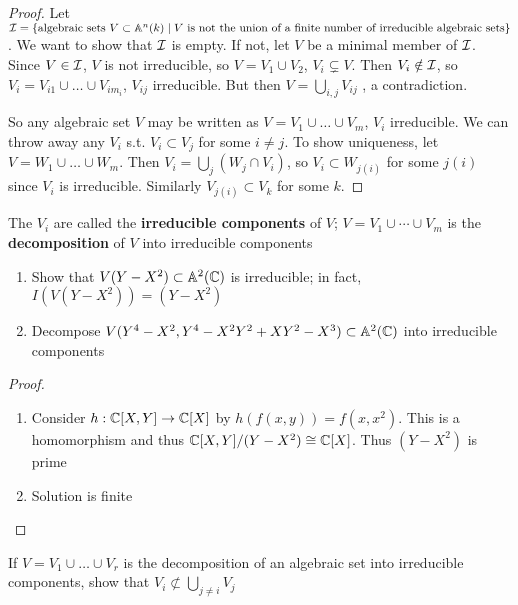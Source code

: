\documentclass[11pt]{article}
\begin{document}
\begin{proof}
Let
\(\mathcal{I}=\{\text{algebraic sets }V\subset\mathbb{A}^n(k)\mid V\text{ is not the union of a finite number of irreducible algebraic sets}\}\).
We want to show that \(\mathcal{I}\) is empty. If not, let \(V\) be a minimal member of \(\mathcal{I}\).
Since \(V\in\mathcal{I}\), \(V\) is not irreducible, so \(V=V_1\cup V_2\), \(V_i\subsetneq V\). Then \(V_i\notin\mathcal{I}\),
so \(V_i=V_{i1}\cup\dots\cup V_{im_i}\), \(V_{ij}\) irreducible. But then \(V=\bigcup_{i,j}V_{ij}\) , a
contradiction.

So any algebraic set \(V\) may be written as \(V=V_1\cup\dots\cup V_m\), \(V_i\) irreducible. We can throw
away any \(V_i\) s.t. \(V_i\subset V_j\) for some \(i\neq j\). To show uniqueness, let \(V=W_1\cup\dots\cup W_m\).
Then \(V_i=\bigcup_j(W_j\cap V_i)\), so \(V_i\subset W_{j(i)}\) for some \(j(i)\) since \(V_i\) is irreducible. Similarly \(V_{j(i)}\subset V_k\) for
some \(k\).
\end{proof}

The \(V_i\) are called the \textbf{irreducible components} of \(V\); \(V=V_1\cup\cdots\cup V_m\) is the \textbf{decomposition}
of \(V\) into irreducible components

\begin{exercise}
\label{ex1.25}
\begin{enumerate}
\item Show that \(V(Y-X^2)\subset\mathbb{A}^2(\mathbb{C})\) is irreducible; in fact, \(I(V(Y-X^2))=(Y-X^2)\)
\item Decompose \(V(Y^4-X^2,Y^4-X^2Y^2+XY^2-X^3)\subset\mathbb{A}^2(\mathbb{C})\) into irreducible components
\end{enumerate}
\end{exercise}

\begin{proof}
\begin{enumerate}
\item Consider \(h:\mathbb{C}[X,Y]\to\mathbb{C}[X]\) by \(h(f(x,y))=f(x,x^2)\). This is a homomorphism and
thus \(\mathbb{C}[X,Y]/(Y-X^2)\cong\mathbb{C}[X]\). Thus \((Y-X^2)\) is prime
\item Solution is finite
\end{enumerate}
\end{proof}

\begin{exercise}
\label{ex1.28}
If \(V=V_1\cup\dots\cup V_r\) is the decomposition of an algebraic set into irreducible components, show
that \(V_i\not\subset\bigcup_{j\neq i}V_j\)
\end{exercise}
\end{document}
